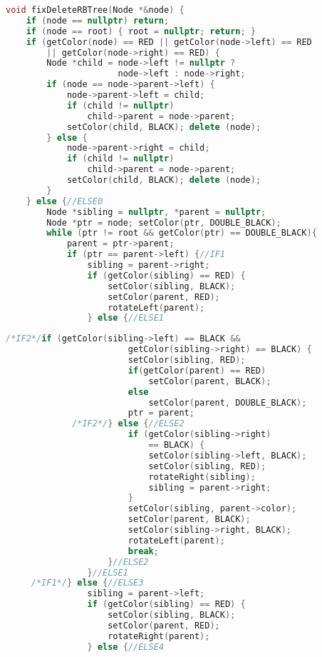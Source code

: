 \begin{lstlisting}[language=C++, title=Parte IV: Remoção (Parte 1 de 4)]
void fixDeleteRBTree(Node *&node) {
	if (node == nullptr) return;
	if (node == root) { root = nullptr; return; }
	if (getColor(node) == RED || getColor(node->left) == RED 
	    || getColor(node->right) == RED) {
		Node *child = node->left != nullptr ? 
		              node->left : node->right;
		if (node == node->parent->left) {
			node->parent->left = child;
			if (child != nullptr)
				child->parent = node->parent;
			setColor(child, BLACK); delete (node);
		} else {
			node->parent->right = child;
			if (child != nullptr)
				child->parent = node->parent;
			setColor(child, BLACK); delete (node);
		}
	} else {//ELSE0
		Node *sibling = nullptr, *parent = nullptr;
		Node *ptr = node; setColor(ptr, DOUBLE_BLACK);
		while (ptr != root && getColor(ptr) == DOUBLE_BLACK){
			parent = ptr->parent;
			if (ptr == parent->left) {//IF1
				sibling = parent->right;
				if (getColor(sibling) == RED) {
					setColor(sibling, BLACK);
					setColor(parent, RED);
					rotateLeft(parent);
				} else {//ELSE1
\end{lstlisting}

\newpage

\begin{lstlisting}[language=C++, title=Parte IV: Remoção (Parte 2 de 4)]
		     /*IF2*/if (getColor(sibling->left) == BLACK &&
					    getColor(sibling->right) == BLACK) {
						setColor(sibling, RED);
						if(getColor(parent) == RED)
							setColor(parent, BLACK);
						else
							setColor(parent, DOUBLE_BLACK);
						ptr = parent;
			 /*IF2*/} else {//ELSE2
						if (getColor(sibling->right) 
						    == BLACK) {
							setColor(sibling->left, BLACK);
							setColor(sibling, RED);
							rotateRight(sibling);
							sibling = parent->right;
						}
						setColor(sibling, parent->color);
						setColor(parent, BLACK);
						setColor(sibling->right, BLACK);
						rotateLeft(parent);
						break;
					}//ELSE2
				}//ELSE1
	 /*IF1*/} else {//ELSE3
				sibling = parent->left;
				if (getColor(sibling) == RED) {
					setColor(sibling, BLACK);
					setColor(parent, RED);
					rotateRight(parent);
				} else {//ELSE4
\end{lstlisting}

\newpage

